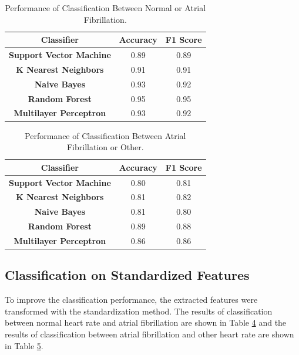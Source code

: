 \documentclass[12pt, a4paper]{article}
\begin{document}
\begin{table}[H]
	\centering
	\begin{tabular}{ | c || c || c |}
		
		\hline
		\textbf{Classifier} & \textbf{Accuracy} & \textbf{F1 Score} \\
		
		\hline
		\textbf{Support Vector Machine} & 0.89 & 0.89 \\
		
		\hline
		\textbf{K Nearest Neighbors} & 0.91 & 0.91\\  
		
		\hline
		\textbf{Naive Bayes} & 0.93 & 0.92\\  
		
		\hline
		\textbf{Random Forest} & 0.95 & 0.95\\ 
		
		\hline
		\textbf{Multilayer Perceptron} & 0.93 & 0.92\\ 
		
		\hline
	\end{tabular}
	\caption{Performance of Classification Between Normal or Atrial Fibrillation.}
	\label{tab:Normal_Atrial}
\end{table}

\begin{table}[H]
	\centering
	\begin{tabular}{ | c || c || c |}
		\hline
		\textbf{Classifier} & \textbf{Accuracy} & \textbf{F1 Score} \\
		
		\hline
		\textbf{Support Vector Machine} & 0.80 & 0.81 \\
		
		\hline
		\textbf{K Nearest Neighbors} & 0.81 & 0.82\\  
		
		\hline
		\textbf{Naive Bayes} & 0.81 & 0.80\\  
		
		\hline
		\textbf{Random Forest} & 0.89 & 0.88\\ 
		
		\hline
		\textbf{Multilayer Perceptron} & 0.86 & 0.86\\ 
		
		\hline
	\end{tabular}
	\caption{Performance of Classification Between Atrial Fibrillation or Other.}
	\label{tab:Atrial_Other}
\end{table}


\subsection{Classification on Standardized Features}
To improve the classification performance, the extracted features were transformed with the standardization method. The results of classification between normal heart rate and atrial fibrillation are shown in Table \hyperref[tab:Normal_Atrial_St]{4} and the results of classification between atrial fibrillation and other heart rate are shown in Table \hyperref[tab:Atrial_Other_St]{5}.
\end{document}
